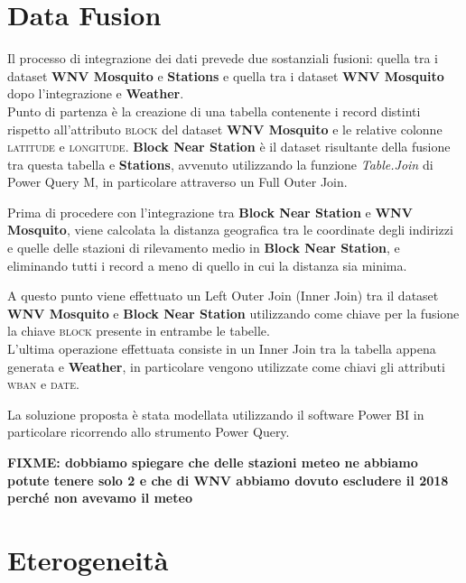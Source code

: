 \section{Data Fusion}
Il processo di integrazione dei dati prevede due sostanziali fusioni: quella tra i dataset \textbf{WNV Mosquito} e \textbf{Stations} e quella tra i dataset \textbf{WNV Mosquito} dopo l'integrazione e \textbf{Weather}.\\ 

Punto di partenza è la creazione di una tabella contenente i record distinti rispetto all'attributo \textsc{block} del dataset \textbf{WNV Mosquito} e le relative colonne \textsc{latitude} e \textsc{longitude}. 
\textbf{Block Near Station} è il dataset risultante della fusione tra questa tabella e \textbf{Stations}, avvenuto utilizzando la funzione \textit{Table.Join} di Power Query M, in particolare attraverso un Full Outer Join. 

Prima di procedere con l'integrazione tra \textbf{Block Near Station} e \textbf{WNV Mosquito}, viene calcolata la distanza geografica tra le coordinate degli indirizzi e quelle delle stazioni di rilevamento medio in \textbf{Block Near Station}, e eliminando tutti i record a meno di quello in cui la distanza sia minima.

A questo punto viene effettuato un Left Outer Join (Inner Join) tra il dataset \textbf{WNV Mosquito} e \textbf{Block Near Station} utilizzando come chiave per la fusione la chiave \textsc{block} presente in entrambe le tabelle.\\


L'ultima operazione effettuata consiste in un Inner Join tra la tabella appena generata e \textbf{Weather}, in particolare vengono utilizzate come chiavi gli attributi \textsc{wban} e \textsc{date}.

La soluzione proposta è stata modellata utilizzando il software Power BI in particolare ricorrendo allo strumento Power Query.

\textbf{FIXME: dobbiamo spiegare che delle stazioni meteo ne abbiamo potute 
tenere solo 2 e che di WNV abbiamo dovuto escludere il 2018 perché non avevamo 
il meteo}

\section{Eterogeneità}
